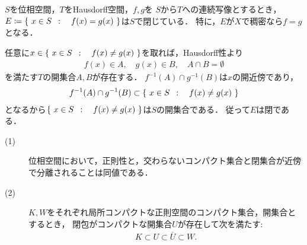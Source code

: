 	\begin{screen}
		\begin{thm}[Hausdorff空間値連続写像の等価域は閉]
			$S$を位相空間，$T$をHausdorff空間，$f,g$を
			$S$から$T$への連続写像とするとき，$E \coloneqq \left\{\ x \in S\ \, : \quad f(x) = g(x)\ \right\}$は$S$で閉じている．
			特に，$E$が$X$で稠密なら$f=g$となる．
		\end{thm}
	\end{screen}
	
	\begin{prf}
		任意に$x \in \left\{\ x \in S\ \, : \quad f(x) \neq g(x)\ \right\}$を取れば，Hausdorff性より
		\begin{align}
			f(x) \in A,\quad g(x) \in B,\quad A \cap B = \emptyset
		\end{align}
		を満たす$T$の開集合$A,B$が存在する．
		$f^{-1}(A) \cap g^{-1}(B)$は$x$の開近傍であり，
		\begin{align}
			f^{-1}(A) \cap g^{-1}(B) \subset \left\{\ x \in S\ \, : \quad f(x) \neq g(x)\ \right\}
		\end{align}
		となるから$\left\{\ x \in S\ \, : \quad f(x) \neq g(x)\ \right\}$は$S$の開集合である．
		従って$E$は閉である．
		\QED
	\end{prf}
	
	\begin{screen}
		\begin{thm}[正則空間とは交わらないコンパクト集合と閉集合が近傍で分離できる空間]
		\label{thm:each_point_in_regular_space_has_closesd_local_base}\mbox{}
			\begin{description}
				\item[(1)] 位相空間において，正則性と，交わらないコンパクト集合と閉集合が近傍で分離されることは同値である．
					
				\item[(2)]
					$K,W$をそれぞれ局所コンパクトな正則空間のコンパクト集合，開集合とするとき，
					閉包がコンパクトな開集合$U$が存在して次を満たす:
					\begin{align}
						K \subset U \subset \overline{U} \subset W.
						\label{eq:thm_each_point_in_regular_space_has_closesd_local_base}
					\end{align}
			\end{description}
		\end{thm}
	\end{screen}
	
